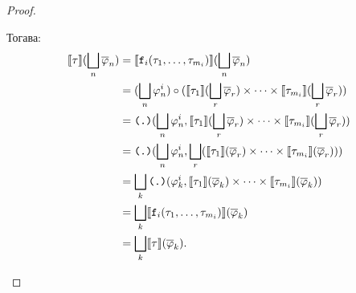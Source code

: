 \begin{proof}
\begin{itemize}
    Тогава:
    \begin{align*}
      \llbracket{\tau}\rrbracket(\bigsqcup_n\overline{\varphi}_n) & = \llbracket{\texttt{f}_i(\tau_1,\dots,\tau_{m_i})}\rrbracket(\bigsqcup_n\overline{\varphi}_n)\\
                                            & = (\bigsqcup_n\varphi^i_n) \circ (\llbracket{\tau_1}\rrbracket(\bigsqcup_r\overline{\varphi}_r) \times \cdots \times \llbracket{\tau_{m_i}}\rrbracket(\bigsqcup_r\overline{\varphi}_r))\\
                                            & = \texttt{(.)}(\bigsqcup_n\varphi^i_n, \llbracket{\tau_1}\rrbracket(\bigsqcup_r\overline{\varphi}_r) \times \cdots \times \llbracket{\tau_{m_i}}\rrbracket(\bigsqcup_r\overline{\varphi}_r))\\
                                            & = \texttt{(.)}(\bigsqcup_n\varphi^i_n, \bigsqcup_r(\llbracket{\tau_1}\rrbracket(\overline{\varphi}_r) \times \cdots \times \llbracket{\tau_{m_i}}\rrbracket(\overline{\varphi}_r)))\\
                                            & = \bigsqcup_k \texttt{(.)}(\varphi^i_k, \llbracket{\tau_1}\rrbracket(\overline{\varphi}_k) \times \cdots \times \llbracket{\tau_{m_i}}\rrbracket(\overline{\varphi}_k))\\
                                            & = \bigsqcup_k \llbracket{\texttt{f}_i(\tau_1,\dots,\tau_{m_i})}\rrbracket(\overline{\varphi}_k)\\
                                            & = \bigsqcup_k \llbracket{\tau}\rrbracket(\overline{\varphi}_k).
    \end{align*}
    
  \end{itemize}
\end{proof}



